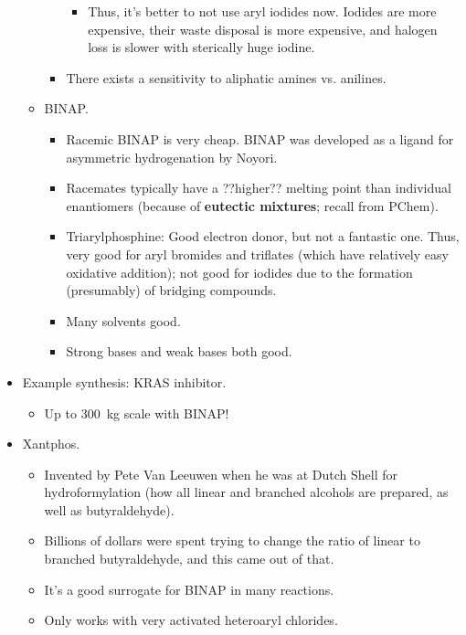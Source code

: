 \documentclass[../notes.tex]{subfiles}
\begin{document}
\begin{itemize}
\begin{itemize}
\begin{itemize}
\begin{itemize}
                \item Thus, it's better to not use aryl iodides now. Iodides are more expensive, their waste disposal is more expensive, and halogen loss is slower with sterically huge iodine.
            \end{itemize}
            \item There exists a sensitivity to aliphatic amines vs. anilines.
        \end{itemize}
        \item BINAP.
        \begin{itemize}
            \item Racemic BINAP is very cheap. BINAP was developed as a ligand for asymmetric hydrogenation by Noyori.
            \item Racemates typically have a ??higher?? melting point than individual enantiomers (because of \textbf{eutectic mixtures}; recall from PChem).
            \item Triarylphosphine: Good electron donor, but not a fantastic one. Thus, very good for aryl bromides and triflates (which have relatively easy oxidative addition); not good for iodides due to the formation (presumably) of bridging compounds.
            \item Many solvents good.
            \item Strong bases and weak bases both good.
        \end{itemize}
    \end{itemize}
    \item Example synthesis: KRAS inhibitor.
    \begin{itemize}
        \item Up to \SI{300}{\kilo\gram} scale with BINAP!
    \end{itemize}
    \item Xantphos.
    \begin{itemize}
        \item Invented by Pete Van Leeuwen when he was at Dutch Shell for hydroformylation (how all linear and branched alcohols are prepared, as well as butyraldehyde).
        \item Billions of dollars were spent trying to change the ratio of linear to branched butyraldehyde, and this came out of that.
        \item It's a good surrogate for BINAP in many reactions.
        \item Only works with very activated heteroaryl chlorides.
        \begin{itemize}

\end{itemize}
\end{itemize}
\end{itemize}
\end{document}
